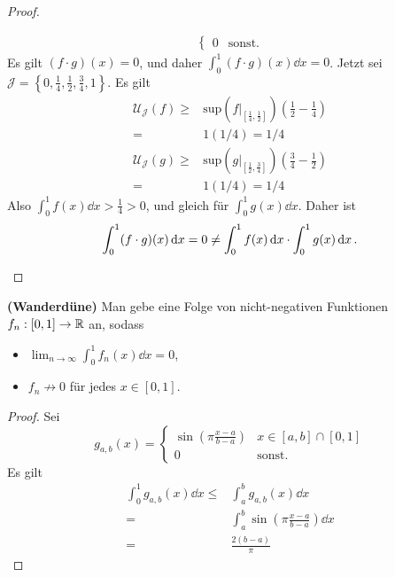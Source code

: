 \begin{proof}
\begin{parts}
\begin{align*}
\begin{cases}
					0 & \text{sonst}.
				\end{cases}
		\end{align*}
		Es gilt $(f\cdot g)(x)=0$, und daher $\int_0^1 (f\cdot g)(x)\dd{x}=0$. Jetzt sei $\mathcal{J}=\left\{ 0,\frac{1}{4},\frac{1}{2},\frac{3}{4},1 \right\} $. Es gilt
		\begin{align*}
			\mathcal{U}_\mathcal{J}\left( f \right) \ge& \text{sup}\left( f|_{\left[\frac{1}{4},\frac{1}{2}\right]} \right)\left( \frac{1}{2}-\frac{1}{4} \right)\\
				=&1(1 / 4)= 1 / 4\\
				\mathcal{U}_\mathcal{J}(g)\ge& \text{sup}\left( g|_{\left[ \frac{1}{2},\frac{3}{4} \right] }  \right)\left( \frac{3}{4}-\frac{1}{2} \right) \\
				=&1(1 / 4)=1 /4
			\end{align*}
			Also $\int_0^1 f(x)\dd{x} > \frac{1}{4}>0$, und gleich f\"{u}r $\int_0^1 g(x)\dd{x}$. Daher ist
			\[
				\int_0^1 (f\cdot g)(x)\dd{x}=0\neq \int_0^1 f(x)\dd{x}\cdot \int_0^1 g(x)\dd{x}
			.\qedhere\] 
	\end{parts}
\end{proof}
\begin{Problem}
	\textbf{(Wanderdüne)}	Man gebe eine Folge von nicht-negativen Funktionen $f_n:[0,1]\to \mathbb{R}$ an, sodass
	\begin{itemize}
		\item $\lim_{n \to \infty} \int_0^1 f_n(x)\dd{x}=0$,
		\item $f_n\not\to0$ f\"{u}r jedes $x\in [0,1]$.
	\end{itemize}
\end{Problem}
\begin{proof}
	Sei
	\[
		g_{a,b}(x)=\begin{cases}
			\sin\left( \pi \frac{x-a}{b-a} \right) & x\in [a,b]\cap [0,1]\\
			0 & \text{sonst}.
		\end{cases}
	\]
	Es gilt
	\begin{align*}
		\int_0^1 g_{a,b}(x)\dd{x}\le& \int_a^b g_{a,b}(x)\dd{x}\\
		=&\int_a^b \sin\left( \pi \frac{x-a}{b-a} \right) \dd{x}\\
		=&\frac{2(b-a)}{\pi}
	\end{align*}
\end{proof}
